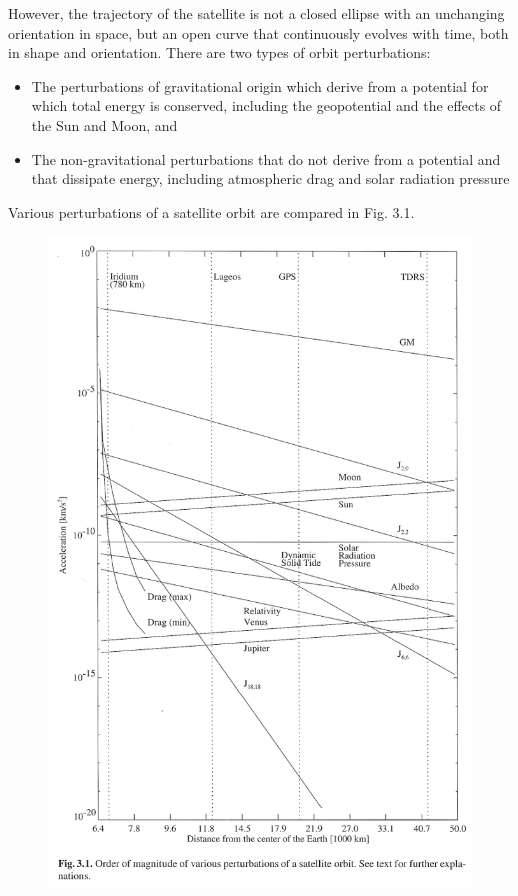 \documentclass[11pt]{article}
\begin{document}
However, the trajectory of the satellite is not a closed
ellipse with an unchanging orientation in space, but an open curve
that continuously evolves with time, both in shape and
orientation. There are two types of orbit perturbations:
\begin{itemize}
\item The perturbations of gravitational origin which derive from a
  potential for which total energy is conserved, including the
  geopotential and the effects of the Sun and Moon, and
\item The non-gravitational perturbations that do not derive from a
  potential and that dissipate energy, including atmospheric drag and
  solar radiation pressure
\end{itemize}
Various perturbations of a satellite orbit are compared in Fig. 3.1.

\begin{figure}
  \begin{center}
    \includegraphics{figure-3-1.pdf}
  \end{center}
\end{figure}
\end{document}
